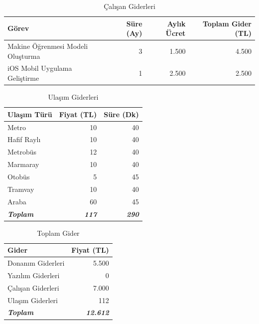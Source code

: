 \begin{table}[!h]
\centering
\caption{Çalışan Giderleri}
\begin{tabular}{|l|r|r|r|}
\hline
\textbf{Görev}  & \textbf{Süre (Ay)} & \textbf{Aylık Ücret} & \textbf{Toplam Gider (TL)} \\ \hline
Makine Öğrenmesi Modeli Oluşturma & 3                  & 1.500                 & 4.500                       \\ \hline
iOS Mobil Uygulama Geliştirme & 1                  & 2.500                 & 2.500                       \\ \hline
\end{tabular}
\end{table}

\begin{table}[!h]
\centering
\caption{Ulaşım Giderleri}
\begin{tabular}{|l|r|r|}
\hline
\textbf{Ulaşım Türü}     & \textbf{Fiyat (TL)}   & \textbf{Süre (Dk)}    \\ \hline
Metro                    & 10                    & 40                    \\ \hline
Hafif Raylı              & 10                    & 40                    \\ \hline
Metrobüs                 & 12                    & 40                    \\ \hline
Marmaray                 & 10                    & 40                    \\ \hline
Otobüs                   & 5                     & 45                    \\ \hline
Tramvay                  & 10                    & 40                    \\ \hline
Araba                    & 60                    & 45                    \\ \hline
\textit{\textbf{Toplam}} & \textit{\textbf{117}} & \textit{\textbf{290}} \\ \hline
\end{tabular}
\end{table}

\begin{table}[!h]
\centering
\caption{Toplam Gider}
\begin{tabular}{|l|r|}
\hline
\textbf{Gider}           & \textbf{Fiyat (TL)}     \\ \hline
Donanım Giderleri        & 5.500                    \\ \hline
Yazılım Giderleri        & 0                       \\ \hline
Çalışan Giderleri        & 7.000                    \\ \hline
Ulaşım Giderleri         & 112                     \\ \hline
\textit{\textbf{Toplam}} & \textit{\textbf{12.612}} \\ \hline
\end{tabular}
\end{table}